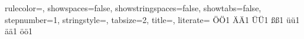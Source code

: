 {  rulecolor=\color{black},         																		%
  showspaces=false,                																		%
  showstringspaces=false,          																		%
  showtabs=false,                  																		%
  stepnumber=1,                    																		%
  stringstyle=\color{java_net_string},     																%
  tabsize=2,	                   																		%
  title=\lstname,                  		 																%
  literate=%
  {Ö}{{\"O}}1
  {Ä}{{\"A}}1
  {Ü}{{\"U}}1
  {ß}{{\ss}}1
  {ü}{{\"u}}1
  {ä}{{\"a}}1
  {ö}{{\"o}}1																							%
}





